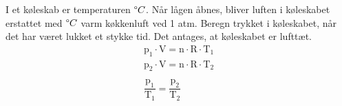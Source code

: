 \documentclass[11pt,a4paper]{article}
\begin{document}
I et køleskab er temperaturen ${\degree C}$. Når lågen åbnes, bliver luften i køleskabet erstattet med ${\degree C}$ varm køkkenluft ved 1 atm. Beregn trykket i køleskabet, når det har været lukket et stykke tid. Det antages, at køleskabet er lufttæt.
    \begin{align*}
        \mathrm{p_1 \cdot V = n\cdot R \cdot T_1} \\
        \mathrm{p_2 \cdot V = n\cdot R \cdot T_2} \\ \\
        \mathrm{\dfrac{p_1}{T_1} = \dfrac{p_2}{T_2}}
    \end{align*}
\end{document}
